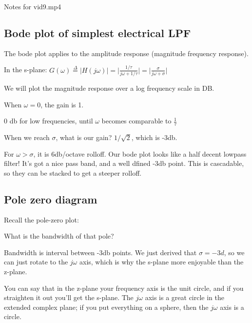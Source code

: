 Notes for vid9.mp4

\subsection*{Bode plot of simplest electrical LPF}

The bode plot applies to the amplitude response (magnitude frequency response).

In the s-plane:
$G(\omega) \stackrel{\Delta}{=} \vert H(j \omega)\vert
=\vert \frac{1/\tau}{j\omega + 1/\tau} \vert =
\vert \frac{\sigma}{j \omega + \sigma} \vert 
$

We will plot the magnitude response over a log frequency scale in DB.

When $\omega = 0$, the gain is 1.

0 db for low frequencies, until $\omega$ becomes comparable to $\frac{1}{\tau}$

When we reach $\sigma$, what is our gain? $1/\sqrt{2}$, which is -3db. 

For $\omega > \sigma$, it is 6db/octave rolloff. Our bode plot looks like a 
half decent lowpass filter! It's got a nice pass band, and a well dfined -3db 
point. This is cascadable, so they can be stacked to get a steeper rolloff.


\subsection*{Pole zero diagram}
Recall the pole-zero plot:

What is the bandwidth of that pole? 

Bandwidth is interval between -3db points. We just derived that $\sigma = -3d$,
so we can just rotate to the $j\omega$ axis, which is why the s-plane
more enjoyable than the z-plane. 

You can say that in the z-plane your 
frequency axis is the unit circle, and if you straighten it out you'll
get the s-plane. The $j\omega$ axis is a great circle in the extended
complex plane; if you put everything on a sphere, then the $j\omega$ axis
is a circle. 
